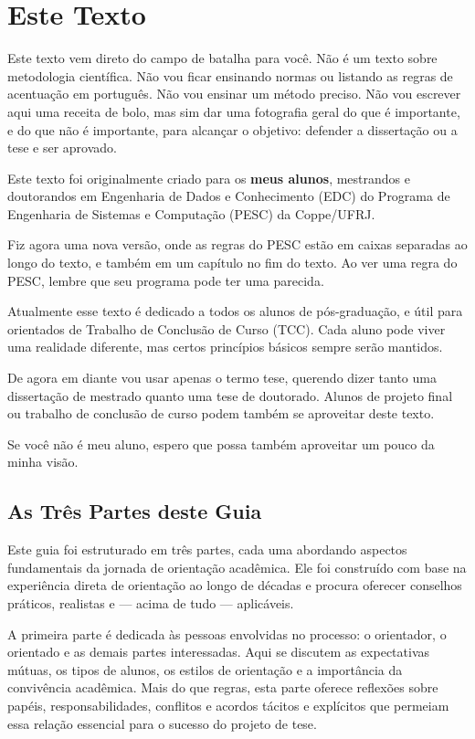 \chapter{Este Texto}

Este texto vem direto do campo de batalha para você.
Não é um texto sobre metodologia científica. Não vou ficar ensinando normas ou listando as regras de acentuação em português. Não vou ensinar um método preciso. Não vou escrever aqui uma receita de bolo, mas sim dar uma fotografia geral do que é importante, e do que não é importante, para alcançar o objetivo: defender a dissertação ou a tese e ser aprovado.

Este texto foi originalmente criado para os \textbf{meus alunos}, mestrandos e doutorandos em Engenharia de Dados e Conhecimento (EDC) do Programa de Engenharia de Sistemas e Computação (PESC) da Coppe/UFRJ. 

Fiz agora uma nova versão, onde as regras do PESC estão em caixas separadas ao longo do texto, e também em um capítulo no fim do texto. Ao ver uma regra do PESC, lembre que seu programa pode ter uma parecida.

Atualmente esse texto é dedicado a todos os alunos de pós-graduação, e útil para orientados de Trabalho de Conclusão de Curso (TCC). Cada aluno pode viver uma realidade diferente, mas certos princípios básicos sempre serão mantidos.

De agora em diante vou usar apenas o termo tese, querendo dizer tanto uma dissertação de mestrado quanto uma tese de doutorado. Alunos de projeto final ou trabalho de conclusão de curso podem também se aproveitar deste texto.

Se você não é meu aluno, espero que possa também aproveitar um pouco da minha visão. 



\section{As Três Partes deste Guia}

Este guia foi estruturado em três partes, cada uma abordando aspectos fundamentais da jornada de orientação acadêmica. Ele foi construído com base na experiência direta de orientação ao longo de décadas e procura oferecer conselhos práticos, realistas e — acima de tudo — aplicáveis.

A primeira parte é dedicada às pessoas envolvidas no processo: o orientador, o orientado e as demais partes interessadas. Aqui se discutem as expectativas mútuas, os tipos de alunos, os estilos de orientação e a importância da convivência acadêmica. Mais do que regras, esta parte oferece reflexões sobre papéis, responsabilidades, conflitos e acordos tácitos e explícitos que permeiam essa relação essencial para o sucesso do projeto de tese.


